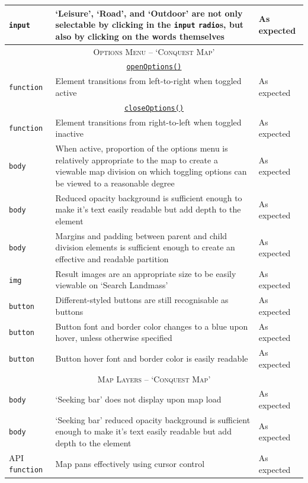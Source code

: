 \documentclass[11pt, english]{article}
\begin{document}
\begin{center}
\begin{longtable}{p{3cm}p{8cm}p{2cm}}
		\texttt{input} & `Leisure', `Road', and `Outdoor' are not only selectable by clicking in the \texttt{input} \texttt{radio}s, but also by clicking on the words themselves & As expected\\
		\hline
		\multicolumn{3}{c}{\textsc{Options Menu -- `Conquest Map'}}\\
		\hline
		\multicolumn{3}{c}{\underline{\texttt{openOptions()}}}\\
		\texttt{function} & Element transitions from left-to-right when toggled active & As expected\\
		\multicolumn{3}{c}{\underline{\texttt{closeOptions()}}}\\
		\texttt{function} & Element transitions from right-to-left when toggled inactive & As expected\\
		\texttt{body} & When active, proportion of the options menu is relatively appropriate to the map to create a viewable map division on which toggling options can be viewed to a reasonable degree & As expected\\
		\texttt{body} & Reduced opacity background is sufficient enough to make it's text easily readable but add depth to the element & As expected\\
		\texttt{body} & Margins and padding between parent and child division elements is sufficient enough to create an effective and readable partition & As expected\\
		\texttt{img} & Result images are an appropriate size to be easily viewable on `Search Landmass' & As expected\\
		\texttt{button} & Different-styled buttons are still recognisable as buttons & As expected\\
		\texttt{button} & Button font and border color changes to a blue upon hover, unless otherwise specified & As expected\\
		\texttt{button} & Button hover font and border color is easily readable & As expected\\
		\hline
		\multicolumn{3}{c}{\textsc{Map Layers -- `Conquest Map'}}\\
		\hline
		\texttt{body} & `Seeking bar' does not display upon map load & As expected\\
		\texttt{body} & `Seeking bar' reduced opacity background is sufficient enough to make it's text easily readable but add depth to the element & As expected\\
		API \texttt{function} & Map pans effectively using cursor control & As expected\\

\end{longtable}
\end{center}
\end{document}
